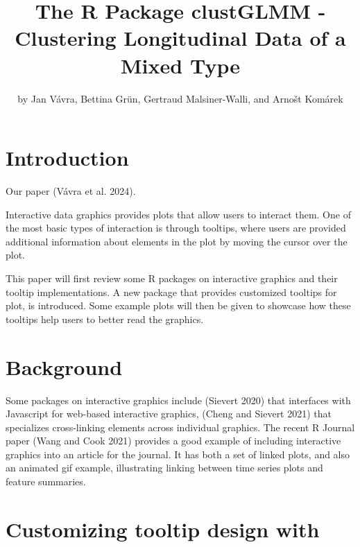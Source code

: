 \title{The R Package clustGLMM - Clustering Longitudinal Data of a Mixed Type}


\author{by Jan Vávra, Bettina Grün, Gertraud Malsiner-Walli, and Arnošt Komárek}

\maketitle


\section{Introduction}\label{introduction}

Our paper (Vávra et al. 2024).

Interactive data graphics provides plots that allow users to interact them. One of the most basic types of interaction is through tooltips, where users are provided additional information about elements in the plot by moving the cursor over the plot.

This paper will first review some R packages on interactive graphics and their tooltip implementations. A new package  that provides customized tooltips for plot, is introduced. Some example plots will then be given to showcase how these tooltips help users to better read the graphics.

\section{Background}\label{background}

Some packages on interactive graphics include  (Sievert 2020) that interfaces with Javascript for web-based interactive graphics,  (Cheng and Sievert 2021) that specializes cross-linking elements across individual graphics. The recent R Journal paper  (Wang and Cook 2021) provides a good example of including interactive graphics into an article for the journal. It has both a set of linked plots, and also an animated gif example, illustrating linking between time series plots and feature summaries.

\section{\texorpdfstring{Customizing tooltip design with }{Customizing tooltip design with }}\label{customizing-tooltip-design-with}

